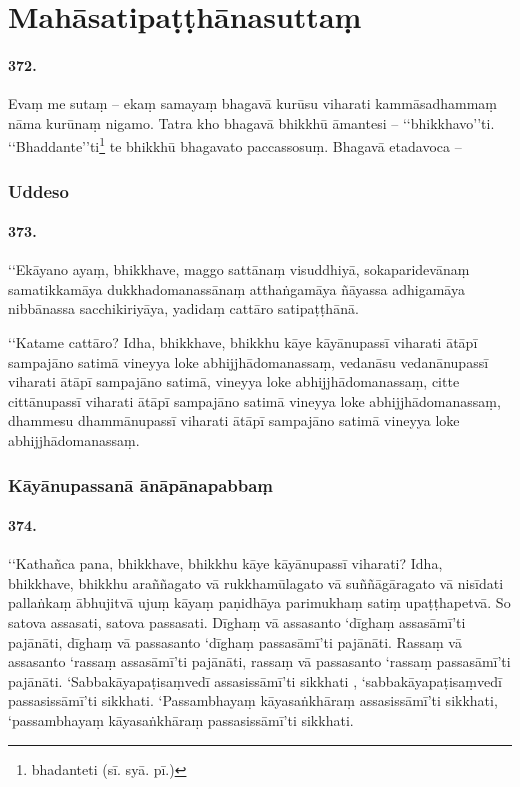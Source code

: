 \section{Mahāsatipaṭṭhānasuttaṃ}

\paragraph{372.} Evaṃ me sutaṃ – ekaṃ samayaṃ bhagavā kurūsu viharati kammāsadhammaṃ nāma kurūnaṃ nigamo. Tatra kho bhagavā bhikkhū āmantesi – ‘‘bhikkhavo’’ti. ‘‘Bhaddante’’ti\footnote{bhadanteti (sī. syā. pī.)} te bhikkhū bhagavato paccassosuṃ. Bhagavā etadavoca –

\subsubsection{Uddeso}

\paragraph{373.} ‘‘Ekāyano ayaṃ, bhikkhave, maggo sattānaṃ visuddhiyā, sokaparidevānaṃ samatikkamāya dukkhadomanassānaṃ atthaṅgamāya ñāyassa adhigamāya nibbānassa sacchikiriyāya, yadidaṃ cattāro satipaṭṭhānā.

‘‘Katame cattāro? Idha, bhikkhave, bhikkhu kāye kāyānupassī viharati ātāpī sampajāno satimā vineyya loke abhijjhādomanassaṃ, vedanāsu vedanānupassī viharati ātāpī sampajāno satimā, vineyya loke abhijjhādomanassaṃ, citte cittānupassī viharati ātāpī sampajāno satimā vineyya loke abhijjhādomanassaṃ, dhammesu dhammānupassī viharati ātāpī sampajāno satimā vineyya loke abhijjhādomanassaṃ.


\subsubsection{Kāyānupassanā ānāpānapabbaṃ}

\paragraph{374.} ‘‘Kathañca pana, bhikkhave, bhikkhu kāye kāyānupassī viharati? Idha, bhikkhave, bhikkhu araññagato vā rukkhamūlagato vā suññāgāragato vā nisīdati pallaṅkaṃ ābhujitvā ujuṃ kāyaṃ paṇidhāya parimukhaṃ satiṃ upaṭṭhapetvā. So satova assasati, satova passasati. Dīghaṃ vā assasanto ‘dīghaṃ assasāmī’ti pajānāti, dīghaṃ vā passasanto ‘dīghaṃ passasāmī’ti pajānāti. Rassaṃ vā assasanto ‘rassaṃ assasāmī’ti pajānāti, rassaṃ vā passasanto ‘rassaṃ passasāmī’ti pajānāti. ‘Sabbakāyapaṭisaṃvedī assasissāmī’ti sikkhati , ‘sabbakāyapaṭisaṃvedī passasissāmī’ti sikkhati. ‘Passambhayaṃ kāyasaṅkhāraṃ assasissāmī’ti sikkhati, ‘passambhayaṃ kāyasaṅkhāraṃ passasissāmī’ti sikkhati.

